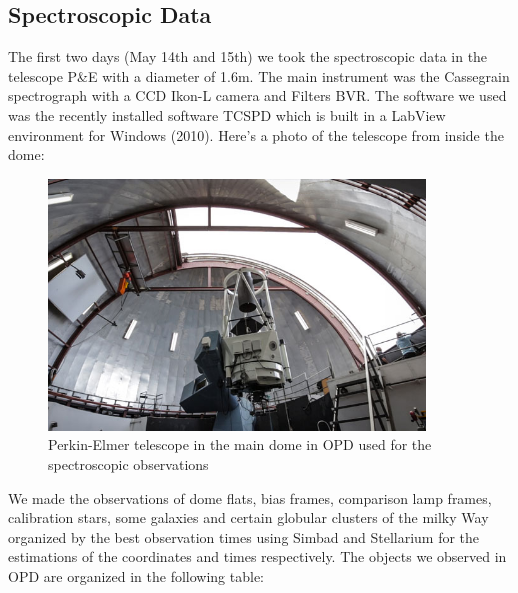 \subsection{Spectroscopic Data}

The first two days (May 14th and 15th) we took the spectroscopic data in the telescope P\&E with a diameter of 1.6m. The main instrument was the Cassegrain spectrograph with a CCD Ikon-L camera and Filters BVR. The software we used was the recently installed software TCSPD which is built in a LabView environment for Windows (2010). Here's a photo of the telescope from inside the dome:

\begin{figure}[H]
\centering
\includegraphics[width=10cm]{images/opd-spectrograph.jpg}
\caption[Perkin-Elmer telescope used for Spectroscopy]{Perkin-Elmer telescope in the main dome in OPD used for the spectroscopic observations}
\end{figure}

We made the observations of dome flats, bias frames, comparison lamp frames, calibration stars, some galaxies and certain globular clusters of the milky Way organized by the best observation times using Simbad and Stellarium for the estimations of the coordinates and times respectively. The objects we observed in OPD are organized in the following table:

